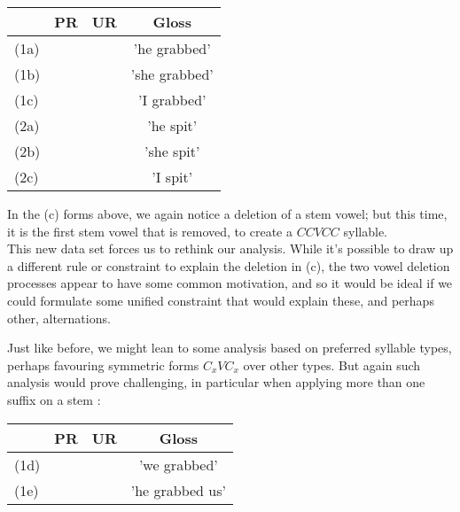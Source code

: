 \documentclass[11pt,draft]{article}
\begin{document}
\begin{table}[htdp]
\begin{tabularx}{400pt}{|l| C | C | C|}
	\hline
	&
	PR &
	UR &
	Gloss \\\hline\hline
	
	(1a) &
	 &
	 &
	'he grabbed' \\
	
	(1b) &
	 &
	 &
	'she grabbed' \\
	
	(1c) &
	 &
	 &
	'I grabbed' \\
	\hline
	
	(2a) &
	 &
	 &
	'he spit' \\
	
	(2b) &
	 &
	 &
	'she spit' \\
	
	(2c) &
	 &
	 &
	'I spit' \\
	\hline
	
\end{tabularx}
\end{table}

In the (c) forms above, we again notice a deletion of a stem vowel; but this time, it is the first stem vowel that is removed, to create a $CCVCC$ syllable.
\\

This new data set forces us to rethink our analysis.
While it's possible to draw up a different rule or constraint to explain the deletion in (c), the two vowel deletion processes appear to have some common motivation, and so it would be ideal if we could formulate some unified constraint that would explain these, and perhaps other, alternations.

\pagebreak

Just like before, we might lean to some analysis based on preferred syllable types, perhaps favouring symmetric forms $C_xVC_x$ over other types. But again such analysis would prove challenging, in particular when applying more than one suffix on a stem \cite{wolf2012}:

\begin{table}[htdp]
\begin{tabularx}{400pt}{|l| C | C | C|}
	\hline
	&
	PR &
	UR &
	Gloss \\\hline\hline
	
	(1d) &
	 &
	 &
	'we grabbed' \\
	
	(1e) &
	 &
	  &
	'he grabbed us' \\
	\hline
	
\end{tabularx}
\end{table}
\end{document}
